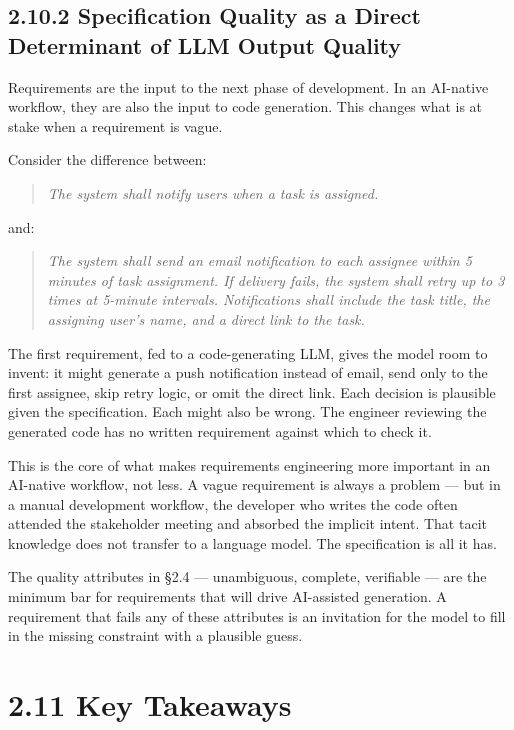 \documentclass[11pt,a4paper]{book}
\begin{document}
\subsection{2.10.2 Specification Quality as a Direct Determinant of LLM Output Quality}

Requirements are the input to the next phase of development. In an AI-native workflow, they are also the input to code generation. This changes what is at stake when a requirement is vague.

Consider the difference between:

\begin{quote}
\textit{\textit{The system shall notify users when a task is assigned.}}
\end{quote}

and:

\begin{quote}
\textit{\textit{The system shall send an email notification to each assignee within 5 minutes of task assignment. If delivery fails, the system shall retry up to 3 times at 5-minute intervals. Notifications shall include the task title, the assigning user's name, and a direct link to the task.}}
\end{quote}

The first requirement, fed to a code-generating LLM, gives the model room to invent: it might generate a push notification instead of email, send only to the first assignee, skip retry logic, or omit the direct link. Each decision is plausible given the specification. Each might also be wrong. The engineer reviewing the generated code has no written requirement against which to check it.

This is the core of what makes requirements engineering more important in an AI-native workflow, not less. A vague requirement is always a problem --- but in a manual development workflow, the developer who writes the code often attended the stakeholder meeting and absorbed the implicit intent. That tacit knowledge does not transfer to a language model. The specification is all it has.

The quality attributes in §2.4 --- unambiguous, complete, verifiable --- are the minimum bar for requirements that will drive AI-assisted generation. A requirement that fails any of these attributes is an invitation for the model to fill in the missing constraint with a plausible guess.

\medskip

\section{2.11 Key Takeaways}
\end{document}
